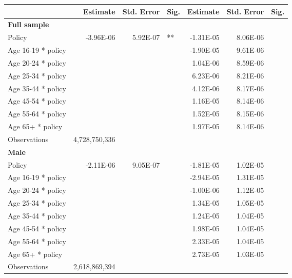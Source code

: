 
\begin{table}%
\centering 
\begin{tabular}{l r r l r r l} 

\hline 
 
 & Estimate & Std. Error & Sig. & Estimate & Std. Error & Sig. \\ 

\hline 
 
\textbf{Full sample} \\ 

Policy             &  -3.96E-06        &  5.92E-07       &   **       &  -1.31E-05        &  8.06E-06       &            \\ 
Age 16-19 * policy           & & &  &  -1.90E-05        &  9.61E-06       &            \\ 
Age 20-24 * policy           & & &  &  1.04E-06        &  8.59E-06       &            \\ 
Age 25-34 * policy           & & &  &  6.23E-06        &  8.21E-06       &            \\ 
Age 35-44 * policy           & & &  &  4.12E-06        &  8.17E-06       &            \\ 
Age 45-54 * policy           & & &  &  1.16E-05        &  8.14E-06       &            \\ 
Age 55-64 * policy           & & &  &  1.52E-05        &  8.15E-06       &            \\ 
Age 65+ * policy           & & &  &  1.97E-05        &  8.14E-06       &            \\ 
Observations & 4,728,750,336 \\ 


\hline 

\textbf{Male} \\ 

Policy             &  -2.11E-06        &  9.05E-07       &            &  -1.81E-05        &  1.02E-05       &            \\ 
Age 16-19 * policy           & & &  &  -2.94E-05        &  1.31E-05       &            \\ 
Age 20-24 * policy           & & &  &  -1.00E-06        &  1.12E-05       &            \\ 
Age 25-34 * policy           & & &  &  1.34E-05        &  1.05E-05       &            \\ 
Age 35-44 * policy           & & &  &  1.24E-05        &  1.04E-05       &            \\ 
Age 45-54 * policy           & & &  &  1.98E-05        &  1.04E-05       &            \\ 
Age 55-64 * policy           & & &  &  2.33E-05        &  1.04E-05       &            \\ 
Age 65+ * policy           & & &  &  2.73E-05        &  1.03E-05       &            \\ 
Observations & 2,618,869,394 \\ 



\end{tabular}
\end{table}
